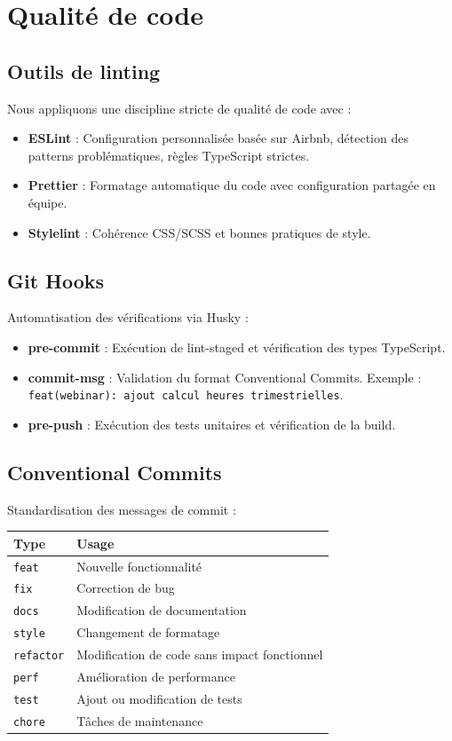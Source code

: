 \newpage
\section{Qualité de code}

\subsection{Outils de linting}
Nous appliquons une discipline stricte de qualité de code avec :
\begin{itemize}
    \item \textbf{ESLint} : Configuration personnalisée basée sur Airbnb, détection des patterns
    problématiques, règles TypeScript strictes.
    \item \textbf{Prettier} : Formatage automatique du code avec configuration partagée en équipe.
    \item \textbf{Stylelint} : Cohérence CSS/SCSS et bonnes pratiques de style.
\end{itemize}

\subsection{Git Hooks}
Automatisation des vérifications via Husky :
\begin{itemize}
    \item \textbf{pre-commit} : Exécution de lint-staged et vérification des types TypeScript.
    \item \textbf{commit-msg} : Validation du format Conventional Commits.
    Exemple : \texttt{feat(webinar): ajout calcul heures trimestrielles}.
    \item \textbf{pre-push} : Exécution des tests unitaires et vérification de la build.
\end{itemize}

\subsection{Conventional Commits}
Standardisation des messages de commit :

\begin{longtable}{|l|p{10cm}|}
\hline
\textbf{Type} & \textbf{Usage} \\ \hline
\texttt{feat}     & Nouvelle fonctionnalité \\ \hline
\texttt{fix}      & Correction de bug \\ \hline
\texttt{docs}     & Modification de documentation \\ \hline
\texttt{style}    & Changement de formatage \\ \hline
\texttt{refactor} & Modification de code sans impact fonctionnel \\ \hline
\texttt{perf}     & Amélioration de performance \\ \hline
\texttt{test}     & Ajout ou modification de tests \\ \hline
\texttt{chore}    & Tâches de maintenance \\ \hline
\end{longtable}

